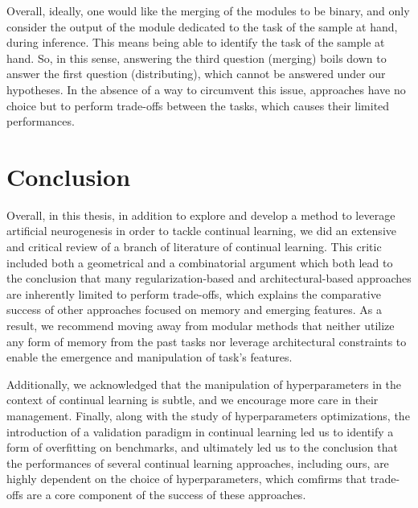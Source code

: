 \documentclass[11pt]{article}
\begin{document}
\vspace{2mm}
\noindent
Overall, ideally, one would like the merging of the modules to be binary, and only consider the output of the module dedicated to the task of the sample at hand, during inference. This means being able to identify the task of the sample at hand. So, in this sense, answering the third question (merging) boils down to answer the first question (distributing), which cannot be answered under our hypotheses. In the absence of a way to circumvent this issue, approaches have no choice but to perform trade-offs between the tasks, which causes their limited performances.






\section{Conclusion}


Overall, in this thesis, in addition to explore and develop a method to leverage artificial neurogenesis in order to tackle continual learning, we did an extensive and critical review of a branch of literature of continual learning. This critic included both a geometrical and a combinatorial argument which both lead to the conclusion that many regularization-based and architectural-based approaches are inherently limited to perform trade-offs, which explains the comparative success of other approaches focused on memory and emerging features. As a result, we recommend moving away from modular methods that neither utilize any form of memory from the past tasks nor leverage architectural constraints to enable the emergence and manipulation of task's features. 

\vspace{2mm}
\noindent
Additionally, we acknowledged that the manipulation of hyperparameters in the context of continual learning is subtle, and we encourage more care in their management. Finally, along with the study of hyperparameters optimizations, the introduction of a validation paradigm in continual learning led us to identify a form of overfitting on benchmarks, and ultimately led us to the conclusion that the performances of several continual learning approaches, including ours, are highly dependent on the choice of hyperparameters, which comfirms that trade-offs are a core component of the success of these approaches. 
\end{document}
